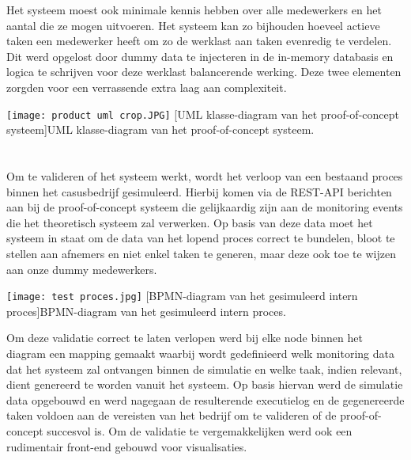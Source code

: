 Het systeem moest ook minimale kennis hebben over alle medewerkers en het aantal die ze mogen uitvoeren. Het systeem kan zo bijhouden hoeveel actieve taken een medewerker heeft om zo de werklast aan taken evenredig te verdelen. Dit werd opgelost door dummy data te injecteren in de in-memory databasis en logica te schrijven voor deze werklast balancerende werking. Deze twee elementen zorgden voor een verrassende extra laag aan complexiteit.

 \begin{center}
  \captionsetup{type=figure}
  \texttt{[image: product uml crop.JPG]}
  [UML klasse-diagram van het proof-of-concept systeem]{UML klasse-diagram van het proof-of-concept systeem.}
\end{center}

\section{}%
\label{sec:validatie}
Om te valideren of het systeem werkt, wordt het verloop van een bestaand proces binnen het casusbedrijf gesimuleerd. Hierbij komen via de REST-API berichten aan bij de proof-of-concept systeem die gelijkaardig zijn aan de monitoring events die het theoretisch systeem zal verwerken. Op basis van deze data moet het systeem in staat om de data van het lopend proces correct te bundelen, bloot te stellen aan afnemers en niet enkel taken te generen, maar deze ook toe te wijzen aan onze dummy medewerkers.

\begin{center}
  \captionsetup{type=figure}
  \texttt{[image: test proces.jpg]}
  [BPMN-diagram van het gesimuleerd intern proces]{BPMN-diagram van het gesimuleerd intern proces.}
\end{center}

Om deze validatie correct te laten verlopen werd bij elke node binnen het diagram een mapping gemaakt waarbij wordt gedefinieerd welk monitoring data dat het systeem zal ontvangen binnen de simulatie en welke taak, indien relevant, dient genereerd te worden vanuit het systeem.  Op basis hiervan werd de simulatie data opgebouwd en werd nagegaan de resulterende executielog en de gegenereerde taken voldoen aan de vereisten van het bedrijf om te valideren of de proof-of-concept succesvol is. Om de validatie te vergemakkelijken werd ook een rudimentair front-end gebouwd voor visualisaties.

